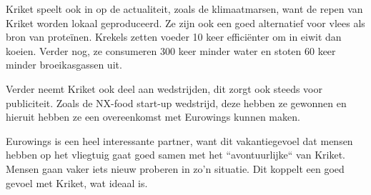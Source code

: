 Kriket speelt ook in op de actualiteit, zoals de klimaatmarsen, want de repen van Kriket worden lokaal geproduceerd. Ze zijn ook een goed alternatief voor vlees als bron van proteïnen. Krekels zetten voeder 10 keer efficiënter om in eiwit dan koeien. Verder nog, ze consumeren 300 keer minder water en stoten 60 keer minder broeikasgassen uit. \autocite{Kriket2018}

Verder neemt Kriket ook deel aan wedstrijden, dit zorgt ook steeds voor publiciteit. Zoals de NX-food start-up wedstrijd, deze hebben ze gewonnen en hieruit hebben ze een overeenkomst met Eurowings kunnen maken. \autocite{KriketEurowings2019}

Eurowings is een heel interessante partner, want dit vakantiegevoel dat mensen hebben op het vliegtuig gaat goed samen met het ``avontuurlijke`` van Kriket. Mensen gaan vaker iets nieuw proberen in zo'n situatie. Dit koppelt een goed gevoel met Kriket, wat ideaal is.
